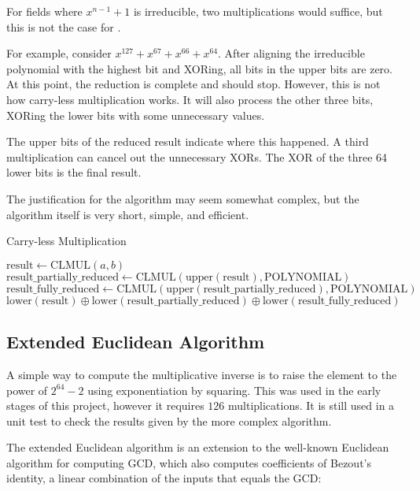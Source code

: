 For fields where $x^{n - 1} + 1$ is irreducible, two multiplications would suffice, but this is not the case for .

For example, consider $x^{127} + x^{67} + x^{66} + x^{64}$.
After aligning the irreducible polynomial with the highest bit and XORing, all bits in the upper bits are zero.
At this point, the reduction is complete and should stop.
However, this is not how carry-less multiplication works. It will also process the other three bits, XORing the lower bits with some unnecessary values.

The upper bits of the reduced result indicate where this happened. A third multiplication can cancel out the unnecessary XORs.
The XOR of the three 64 lower bits is the final result.

The justification for the algorithm may seem somewhat complex, but the algorithm itself is very short, simple, and efficient.

\begin{algorithm}
\caption{Carry-less Multiplication}
\begin{algorithmic}
\State $\text{result} \gets \text{CLMUL}(a, b)$
\State $\text{result\_partially\_reduced} \gets \text{CLMUL}(\text{upper}(\text{result}), \text{POLYNOMIAL})$
\State $\text{result\_fully\_reduced} \gets \text{CLMUL}(\text{upper}(\text{result\_partially\_reduced}), \text{POLYNOMIAL})$
\State \Return $\text{lower}(\text{result}) \oplus \text{lower}(\text{result\_partially\_reduced}) \oplus \text{lower}(\text{result\_fully\_reduced})$
\EndFunction
\end{algorithmic}
\end{algorithm}

\subsection{Extended Euclidean Algorithm}

A simple way to compute the multiplicative inverse is to raise the element to the power of $2^{64} - 2$ using exponentiation by squaring.
This was used in the early stages of this project, however it requires $126$ multiplications.
It is still used in a unit test to check the results given by the more complex algorithm.

The extended Euclidean algorithm is an extension to the well-known Euclidean algorithm for computing GCD, which also computes coefficients of Bezout's identity, a linear combination of the inputs that equals the GCD:

